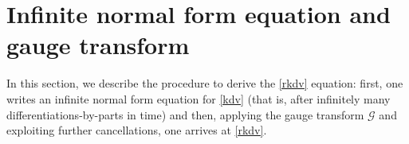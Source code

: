 \documentclass[%
11pt,  reqno]{amsart}
\newcommand{\5}{\textup{V}}
\newcommand{\noi}{\noindent}
\newcommand{\FL}{\mathcal{F} L}
\newcommand{\ft}{\widehat}
\theoremstyle{remark}
\newcommand{\R}{\mathbb{R}}
\newcommand{\Ft}{{\mathcal{F}}}
\newcommand{\jb}[1]
{\langle #1 \rangle}
\newcommand{\Gc}{\mathcal{G}}
\numberwithin{equation}{section}
\numberwithin{theorem}{section}
\newcommand{\andreia}[1]{\marginpar{\color{purple} $\Leftarrow\Leftarrow\Leftarrow$}{\smallskip \noi\color{purple}ANDREIA: #1}\smallskip}
\newcommand{\simao}[1]{\marginpar{\color{red} $\Leftarrow\Leftarrow\Leftarrow$}{\smallskip \noi\color{red}SIMAO: #1}\smallskip}
\begin{document}









\section{Infinite normal form equation and gauge transform}\label{sec:infr}


In this section, we describe the procedure to derive the \eqref{rkdv} equation: 
first, one writes an infinite normal form equation for \eqref{kdv} (that is, after infinitely
many differentiations-by-parts in time) and then, applying the gauge transform $\Gc$ and exploiting further cancellations, one arrives at \eqref{rkdv}. 
 
\end{document}
